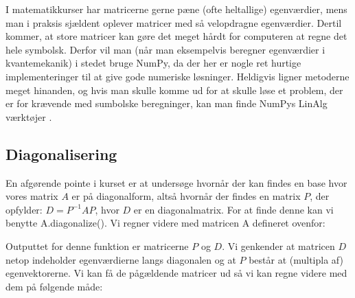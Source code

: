 \documentclass[letterpaper,10pt,english]{jupyterBook}
\begin{document}
\begin{sphinxVerbatim}[commandchars=\\\{\}]
\end{sphinxVerbatim}

\noindent{}

I matematikkurser har matricerne gerne pæne (ofte heltallige) egenværdier, mens man i praksis sjældent oplever matricer med så velopdragne egenværdier. Dertil kommer, at store matricer kan gøre det meget hårdt for computeren at regne det hele symbolsk. Derfor vil man (når man eksempelvis beregner egenværdier i kvantemekanik) i stedet bruge NumPy, da der her er nogle ret hurtige implementeringer til at give gode numeriske løsninger. Heldigvis ligner metoderne meget hinanden, og hvis man skulle komme ud for at skulle løse et problem, der er for krævende med sumbolske beregninger, kan man finde NumPys LinAlg værktøjer .


\subsection{Diagonalisering}
\label{\detokenize{notebooks/sympy/Notebook_LinAlg_2:diagonalisering}}
En afgørende pointe i kurset er at undersøge hvornår der kan findes en base hvor vores matrix \(A\) er på diagonalform, altså hvornår der findes en matrix \(P\), der opfylder: \(D = P^{-1}AP\), hvor \(D\) er en diagonalmatrix. For at finde denne kan vi benytte A.diagonalize(). Vi regner videre med matricen A defineret ovenfor:

\begin{sphinxVerbatim}[commandchars=\\\{\}]
\end{sphinxVerbatim}

\noindent{}

\begin{sphinxVerbatim}[commandchars=\\\{\}]
\end{sphinxVerbatim}

\noindent{}

Outputtet for denne funktion er matricerne \(P\) og \(D\). Vi genkender at matricen \(D\) netop indeholder egenværdierne langs diagonalen og at \(P\) består at (multipla af) egenvektorerne. Vi kan få de pågældende matricer ud så vi kan regne videre med dem på følgende måde:
\end{document}
